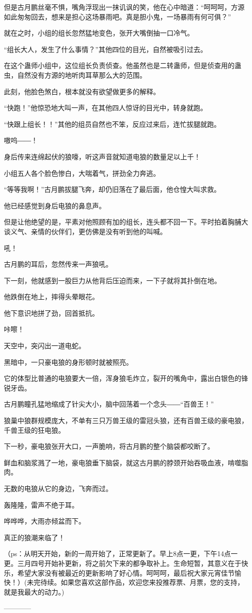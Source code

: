 \begin{this_body}
但是古月鹏丝毫不惧，嘴角浮现出一抹讥讽的笑，他在心中暗道：“呵呵呵，方源如此匆匆回去，想来是担心这场暴雨吧。真是胆小鬼，一场暴雨有何可俱？”

就在之时，小组的组长忽然猛地变色，张开大嘴倒抽一口冷气。

“组长大人，发生了什么事情？”其他四位的目光，自然被吸引过去。

在这个蛊师小组中，这位组长负责侦查。他虽然也是二转蛊师，但是侦查用的蛊虫，自然没有方源的地听肉耳草那么大的范围。

此刻，他脸色煞白，根本就没有欲望做更多的解释。

“快跑！”他惊恐地大叫一声，在其他四人惊讶的目光中，转身就跑。

“快跟上组长！！”其他的组员自然也不笨，反应过来后，连忙拔腿就跑。

嗷呜――！

身后传来连绵起伏的狼嚎，听这声音就知道电狼的数量足以上千！

小组五人各个脸色惨白，大喘着气，拼劲全力奔逃。

“等等我啊！”古月鹏拔腿飞奔，却仍旧落在了最后面，他仓惶大叫求救。

他已经感觉到身后电狼的鼻息声。

但是让他绝望的是，平素对他照顾有加的组长，连头都不回一下。平时拍着胸脯大谈义气、亲情的伙伴们，更仿佛是没有听到他的叫喊。

吼！

古月鹏的耳后，忽然传来一声狼吼。

下一刻，他就感到一股巨力从他背后压迫而来，一下子就将其扑倒在地。

他跌倒在地上，摔得头晕眼花。

他下意识地拼了劲，回首抵抗。

咔嚓！

天空中，突闪出一道电蛇。

黑暗中，一只豪电狼的身形顿时就被照亮。

它的体型比普通的电狼要大一倍，浑身狼毛炸立，裂开的嘴角中，露出白银色的锋锐牙齿。

古月鹏瞳孔猛地缩成了针尖大小，脑中回荡着一个念头――“百兽王！”

狼巢中狼群规模庞大，不单有三只万兽王级的雷冠头狼，还有百兽王级的豪电狼，千兽王级的狂电狼。

下一秒，豪电狼张开大口，一声脆响，将古月鹏的整个脑袋都咬断了。

鲜血和脑浆溅了一地，豪电狼垂下脑袋，就这古月鹏的脖颈开始吞吸血液，啃噬脂肉。

无数的电狼从它的身边，飞奔而过。

轰隆隆，雷声不绝于耳。

哗哗哗，大雨亦倾盆而下。

真正的狼潮来临了！

（ps：从明天开始，新的一周开始了，正常更新了。早上8点一更，下午14点一更。三月四号开始补更新，将之前欠下来的都争取补上。生命短暂，其意义在于快乐，希望大家没有被最近的更新影响了好心情。呵呵呵，最后祝大家元宵佳节愉快！）(未完待续。如果您喜欢这部作品，欢迎您来投推荐票、月票，您的支持，就是我最大的动力。)

------------

\end{this_body}

